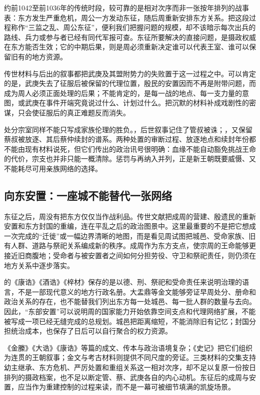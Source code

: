 约前1042至前1036年的传统时段，较可靠的是相对次序而非一张按年排列的战事表：东方发生严重危机，周公一方发动东征，随后周重新安排东方关系。把这段过程称作“三监之乱、周公东征”，便利我们把握问题的规模，却不该暗示每次出兵的路线、兵力或参与者已经有同代军报可查。东征所要解决的直接问题，是摄政权威在东方能否生效；它的中期后果，则是周必须重新决定谁可以代表王室、谁可以保留旧有的地方资源。


传世材料与后出的叙事都把武庚及其盟附势力的失败置于这一过程之中。可以肯定的是，武庚失去了征服后被保留的代理位置，殷民的安置因而不再是附带问题，而成为周人必须正面处理的后果；不能肯定的，是每一战的地点、每一支力量的意图，或武庚在事件开端究竟说过什么、计划过什么。把沉默的材料补成戏剧性的密谋，只会使征服后的真正难题反而消失。

处分宗室同样不能只写成家族伦理的胜负。，后世叙事记住了管叔被诛；，又保留蔡叔被放逐、其后蔡仲续封的谱系。两种处置的审断过程、放逐地点和续封年份都不能由现有材料说死，但它们传出的政治讯号很明确：血缘不能自动豁免挑战王命的代价，宗支也并非只能一概清除。惩罚与再纳入并列，正是新王朝既要威慑、又不能耗尽可用亲族网络的选择。

\subsection{向东安置：一座城不能替代一张网络}

东征之后，周没有把东方仅仅当作战利品。传世文献把成周的营建、殷遗民的重新安置和东方封国的重编，连在平乱之后的政治图景中。这里最重要的不是把它想成一次完成的“迁徙”或一幅边界清晰的地图，而是看见周试图把城邑、受命家族、旧有人群、道路与祭祀关系编成新的秩序。成周作为东方支点，使宗周的王命能够更接近旧商腹地；受命者与被安置者之间如何分担劳役、守卫和祭祀责任，则仍须在地方关系中逐步落实。

的《康诰》《酒诰》《梓材》保存的是以德、刑、祭祀和受命责任来说明治理的语言，不是一部现代意义的地方行政名册。大盂鼎等金文能够旁证早周处分、册命和政治关系的存在，也不能替我们列出东方每一处城邑、每一批人群的数量与去向。因此，“东部安置”可以说明周的国家能力开始依靠空间支点和代理网络扩展，不能被写成一项已经无缝完成的总规划。城邑把距离缩短，不能消除旧有记忆；封国分担统治成本，也保存了日后可以自行聚合的权力资源。

\begin{debate}[摄政、东征与安置能复原到什么程度]
《金縢》《大诰》《康诰》等篇的成文、传本与政治语境复杂；《史记》把它们组织为连贯的王朝叙事；金文与考古材料则提供不同尺度的旁证。三类材料的交集支持幼主继承、东方危机、严厉处置和重组关系这一相对次序，却不足以复原一份按日排列的摄政档案，也不足以断定管、蔡、武庚各自的内心动机。东征后的成周与安置，应当作为重建控制的过程来读，而不是一幕可被细节填满的凯旋场景。
\end{debate}

